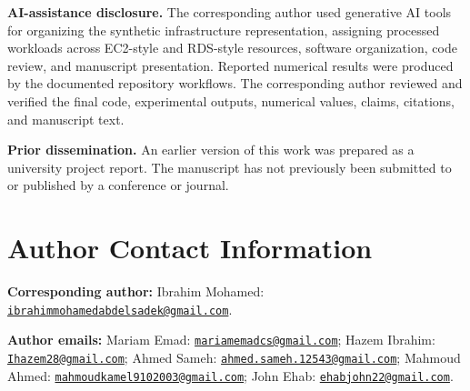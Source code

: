 \documentclass[11pt]{article}
\begin{document}
\textbf{AI-assistance disclosure.} The corresponding author used generative
AI tools for organizing the synthetic infrastructure representation, assigning
processed workloads across EC2-style and RDS-style resources, software
organization, code review, and manuscript presentation. Reported numerical
results were produced by the documented repository workflows. The
corresponding author reviewed and verified the final code, experimental
outputs, numerical values, claims, citations, and manuscript text.

\textbf{Prior dissemination.} An earlier version of this work was prepared as
a university project report. The manuscript has not previously been submitted
to or published by a conference or journal.

\section*{Author Contact Information}
\noindent\textbf{Corresponding author:} Ibrahim Mohamed:
\href{mailto:ibrahimmohamedabdelsadek@gmail.com}{\nolinkurl{ibrahimmohamedabdelsadek@gmail.com}}.

\noindent\textbf{Author emails:} Mariam Emad:
\href{mailto:mariamemadcs@gmail.com}{\nolinkurl{mariamemadcs@gmail.com}}; Hazem Ibrahim:
\href{mailto:Ihazem28@gmail.com}{\nolinkurl{Ihazem28@gmail.com}}; Ahmed Sameh:
\href{mailto:ahmed.sameh.12543@gmail.com}{\nolinkurl{ahmed.sameh.12543@gmail.com}}; Mahmoud Ahmed:
\href{mailto:mahmoudkamel9102003@gmail.com}{\nolinkurl{mahmoudkamel9102003@gmail.com}}; John Ehab:
\href{mailto:ehabjohn22@gmail.com}{\nolinkurl{ehabjohn22@gmail.com}}.



\end{document}
